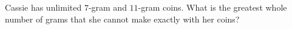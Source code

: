 Cassie has unlimited $7$-gram and $11$-gram coins. What is the greatest whole number of grams that she cannot make exactly with her coins?
